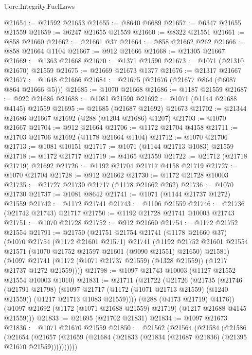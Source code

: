 \begin{lexlean}{Uorc.Integrity.FuelLaws}
\begin{coremodule}
@21654 := @21592 @21653
@21655 := @8640 @6689
@21657 := @6347 @21655 @21559
@21659 := @6247 @21655 @21559
@21660 := @8322 @21551
@21661 := @858 @21660
@21662 := @21661 @37
@21664 := @858 @21662 @262
@21666 := @858 @21664 @1104
@21667 := @912 @21666
@21668 := @21305 @21667
@21669 := @1363 @21668
@21670 := @1371 @21590
@21673 := @1071 (@21310 @21670) @21559
@21675 := @21669 @21673 @1377
@21676 := @21317 @21667
@21677 := @1648 @21666
@21684 := @21675 (@21676 (@21677 @864 (@6087 @864 @21666 @5)))
@21685 := @1070 @21668
@21686 := @1187 @21559
@21687 := @922 @21686
@21688 := @1081 @21590
@21692 := @1071 (@1144 @21688 @4145) @21559
@21695 := @21685 (@21687 @21692) @21673
@21702 := @21344 @21686 @21667 @21692 (@288 (@1204 @21686) @1207)
@21703 := @1070 @21667
@21704 := @912 @21664
@21706 := @1172 @21704 @4158
@21711 := @21703 @21706 @21692 (@1178 @21664 @1104)
@21712 := @1070 @21706
@21713 := @1081 @10151
@21717 := @1071 (@1144 @21713 @1083) @21559
@21718 := @1172 @21717
@21719 := @4165 @21559
@21722 := @21712 (@21718 @21719) @21692
@21726 := @1192 @21704 @21717 @4158 @21719
@21727 := @1070 @21704
@21728 := @912 @21662
@21730 := @1172 @21728 @10003
@21735 := @21727 @21730 @21717 (@1178 @21662 @262)
@21736 := @1070 @21730
@21737 := @1081 @8642
@21741 := @1071 (@1144 @21737 @1272) @21559
@21742 := @1172 @21741
@21743 := @1106 @21559
@21746 := @21736 (@21742 @21743) @21717
@21750 := @1192 @21728 @21741 @10003 @21743
@21751 := @1070 @21728
@21752 := @912 @21660
@21754 := @1172 @21752 @21554
@21791 := @21750
    (@21751
      @21754
      @21741
      (@1178 @21660 @37)
      (@1070
        @21754
        (@1172 @21601 @21571)
        @21741
        (@1192
          @21752
          @21601
          @21554
          @21571
          (@1070 @21752 @21597 @21601 (@9090 @21551) @21650)
          @21581)
        (@1097 @21741 (@1172 (@1071 @21737 @21559) (@1328 @21559)) (@1217 @21737 @1272 @21559))))
@21798 := @1097 @21743 @10003 (@1127 @21552 @21554 @10003 @1010)
@21831 := @21711
    (@21722
      (@21726
        (@21735
          (@21746
            (@21791 @21798)
            (@1097
              @21717
              (@1172 (@1071 @21713 @21559) (@1240 @21559))
              (@1217 @21713 @1083 @21559))))
        (@288 (@4173 @21719) @4176))
      (@1097 @21692 (@1172 (@1071 @21688 @21559) @21719) (@1217 @21688 @4145 @21559)))
@21833 := @21695 (@21702 @21831)
@21834 := @1097 @21673
@21836 := @1071 @21670 @21559
@21850 := @21562
    (@21564
      (@21584
        (@21586
          (@21654
            (@21657 (@21659 (@21684 (@21833 (@21834 (@21687 @21836) (@21395 @21670 @21559))))))))))

\end{coremodule}
\end{lexlean}
